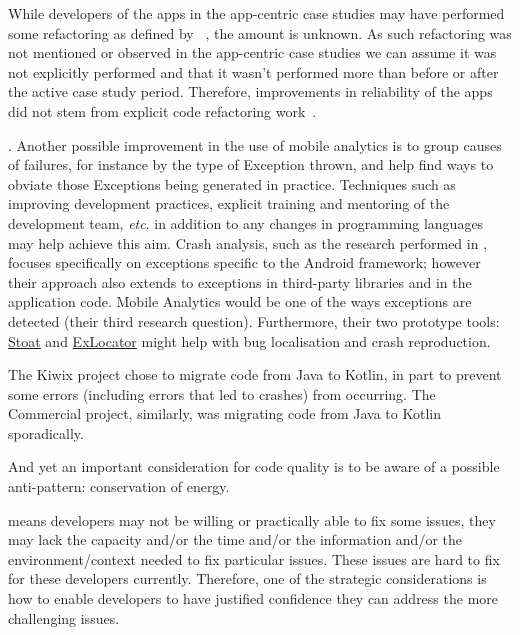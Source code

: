 While developers of the apps in the app-centric case studies may have performed some refactoring as defined by ~, the amount is unknown. As such refactoring was not mentioned or observed in the app-centric case studies we can assume it was not explicitly performed and that it wasn't performed more than before or after the active case study period. Therefore, improvements in reliability of the apps did not stem from explicit code refactoring work~.

. 
Another possible improvement in the use of mobile analytics is to group causes of failures, for instance by the type of Exception thrown, and help find ways to obviate those Exceptions being generated in practice. Techniques such as improving development practices, explicit training and mentoring of the development team, \emph{etc}. in addition to any changes in programming languages may help achieve this aim. %
Crash analysis, such as the research performed in , focuses specifically on exceptions specific to the Android framework; however their approach also extends to exceptions in third-party libraries and in the application code. Mobile Analytics would be one of the ways exceptions are detected (their third research question). Furthermore, their two prototype tools: \href{https://github.com/tingsu/Stoat}{Stoat} and \href{https://github.com/crashanalysis/ExLocator}{ExLocator} might help with bug localisation and crash reproduction.

The Kiwix project chose to migrate code from Java to Kotlin, in part to prevent some errors (including errors that led to crashes) from occurring. The Commercial project, similarly, was migrating code from Java to Kotlin sporadically.


And yet an important consideration for code quality is to be aware of a possible anti-pattern: conservation of energy.

means developers may not be willing or practically able to fix some issues, they may lack the capacity and/or the time and/or the information and/or the environment/context needed to fix particular issues. These issues are hard to fix for these developers currently.
%
Therefore, one of the strategic considerations is how to enable developers to have justified confidence they can address the more challenging issues.

